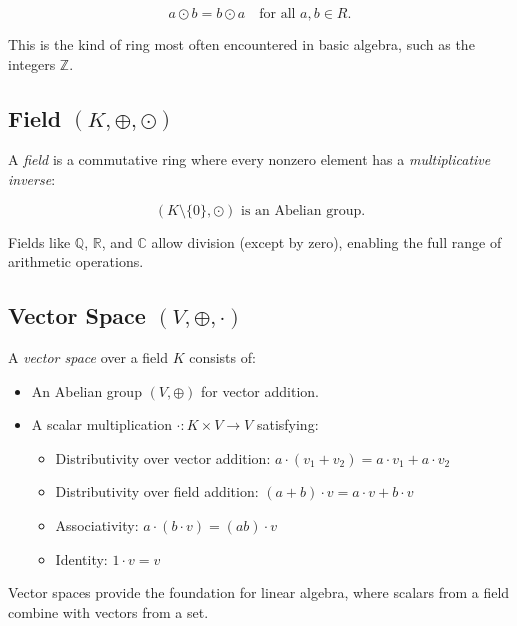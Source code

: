 \[
a \odot b = b \odot a \quad \text{for all } a, b \in R.
\]

This is the kind of ring most often encountered in basic algebra, such as the integers \(\mathbb{Z}\).

\subsection{Field \texorpdfstring{\((K, \oplus, \odot)\)}{}}
A \emph{field} is a commutative ring where every nonzero element has a \emph{multiplicative inverse}:

\[
(K \setminus \{0\}, \odot) \text{ is an Abelian group}.
\]

Fields like \(\mathbb{Q}\), \(\mathbb{R}\), and \(\mathbb{C}\) allow division (except by zero), enabling the full range of arithmetic operations.

\subsection{Vector Space \texorpdfstring{\((V, \oplus, \cdot)\)}{}}

A \emph{vector space} over a field \(K\) consists of:
\begin{itemize}[label=\(-\)]
  \item An Abelian group \((V, \oplus)\) for vector addition.
  \item A scalar multiplication \(\cdot: K \times V \to V\) satisfying:
  \begin{itemize}
    \item Distributivity over vector addition: \(a \cdot (v_1 + v_2) = a \cdot v_1 + a \cdot v_2\)
    \item Distributivity over field addition: \((a + b) \cdot v = a \cdot v + b \cdot v\)
    \item Associativity: \(a \cdot (b \cdot v) = (ab) \cdot v\)
    \item Identity: \(1 \cdot v = v\)
  \end{itemize}
\end{itemize}

Vector spaces provide the foundation for linear algebra, where scalars from a field combine with vectors from a set.

